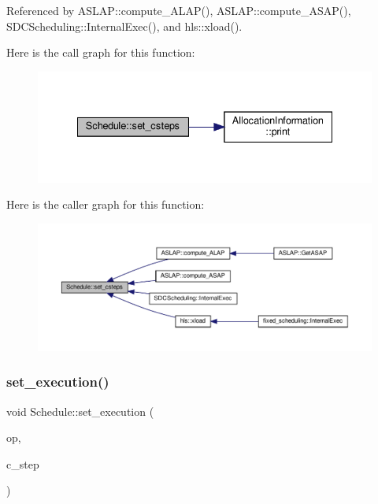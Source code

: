 Referenced by A\+S\+L\+A\+P\+::compute\+\_\+\+A\+L\+A\+P(), A\+S\+L\+A\+P\+::compute\+\_\+\+A\+S\+A\+P(), S\+D\+C\+Scheduling\+::\+Internal\+Exec(), and hls\+::xload().

Here is the call graph for this function\+:
\nopagebreak
\begin{figure}[H]
\begin{center}
\leavevmode
\includegraphics[width=335pt]{df/d61/classSchedule_ac54cd77d3f23af1c4ced5daed0aeef78_cgraph}
\end{center}
\end{figure}
Here is the caller graph for this function\+:
\nopagebreak
\begin{figure}[H]
\begin{center}
\leavevmode
\includegraphics[width=350pt]{df/d61/classSchedule_ac54cd77d3f23af1c4ced5daed0aeef78_icgraph}
\end{center}
\end{figure}
\mbox{\label{classSchedule_a1bf4292733805b6e305ec28395cd04d0}} 
\subsubsection{\texorpdfstring{set\+\_\+execution()}{set\_execution()}}
{\footnotesize\ttfamily void Schedule\+::set\+\_\+execution (\begin{DoxyParamCaption}\item[{const \hyperlink{graph_8hpp_abefdcf0544e601805af44eca032cca14}{vertex} \&}]{op,  }\item[{Control\+Step}]{c\+\_\+step }\end{DoxyParamCaption})}



